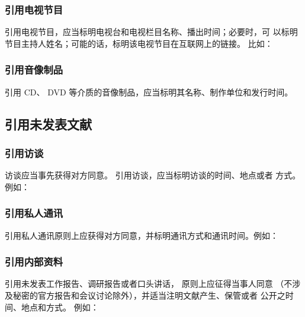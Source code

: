 \documentclass{article}
\begin{document}
\subsubsection{引用电视节目}

引用电视节目，应当标明电视台和电视栏目名称、播出时间；必要时，可
以标明节目主持人姓名；可能的话，标明该电视节目在互联网上的链接。
比如：
\begin{quotation}
\end{quotation}

\subsubsection{引用音像制品}
引用 CD、 DVD 等介质的音像制品，应当标明其名称、制作单位和发行时间。


\subsection{引用未发表文献}

\subsubsection{引用访谈}
访谈应当事先获得对方同意。 引用访谈，应当标明访谈的时间、地点或者
方式。例如：

\begin{quotation}
\end{quotation}

\subsubsection{引用私人通讯}
引用私人通讯原则上应获得对方同意，并标明通讯方式和通讯时间。例如：

\begin{quotation}
\end{quotation}

\subsubsection{引用内部资料}
引用未发表工作报告、调研报告或者口头讲话， 原则上应征得当事人同意
（不涉及秘密的官方报告和会议讨论除外），并适当注明文献产生、保管或者
公开之时间、地点和方式。 
例如：
\begin{quotation}

\end{quotation}
\end{document}
